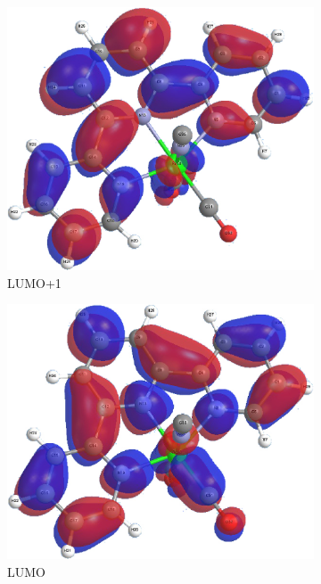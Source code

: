 \begin{figure}[!ht]
\begin{subfigure}[b]{0.31\textwidth}
  \includegraphics[clip=true, width=\textwidth, keepaspectratio]{images/mos/6l+1.eps}
  \caption{LUMO+1}
 \end{subfigure}
  \begin{subfigure}[b]{0.31\textwidth}
  \includegraphics[clip=true, width=\textwidth, keepaspectratio]{images/mos/6l.eps}
  \caption{LUMO}
 \end{subfigure}
 \begin{subfigure}[b]{0.31\textwidth}

\end{subfigure}
\end{figure}
